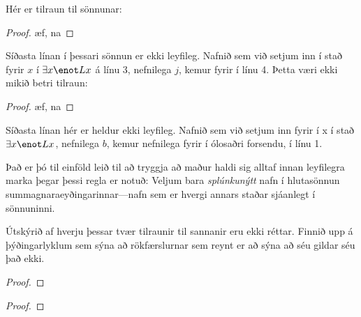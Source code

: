 Hér er tilraun til sönnunar:
\begin{proof}
	\open	
		\ae{f, na}
	\close
\end{proof}
Síðasta línan í þessari sönnun er ekki leyfileg. Nafnið sem við setjum inn í stað fyrir $x$ í $\exists x \enot Lx$ á línu 3, nefnilega $j$, kemur fyrir í línu 4.
Þetta væri ekki mikið betri tilraun:
\begin{proof}
	\open	
		\ae{f, na}
	\close
\end{proof}
Síðasta línan hér er heldur ekki leyfileg. Nafnið sem við setjum inn fyrir í x í stað $\exists x \enot Lx$, nefnilega $b$, kemur nefnilega fyrir í ólosaðri forsendu, í línu 1.

Það er þó til einföld leið til að tryggja að maður haldi sig alltaf innan leyfilegra marka þegar þessi regla er notuð: Veljum bara \emph{splúnkunýtt} nafn í hlutasönnun summagnaraeyðingarinnar---nafn sem er hvergi annars staðar sjáanlegt í sönnuninni.

 

\practiceproblems
\problempart
Útskýrið af hverju þessar tvær tilraunir til sannanir eru ekki réttar. Finnið upp á þýðingarlyklum sem sýna að rökfærslurnar sem reynt er að sýna að séu gildar séu það ekki.
\begin{multicols}{2}
	\begin{proof}
	\end{proof}
	\begin{proof}
		\open
		\close
	\end{proof}
\end{multicols}

